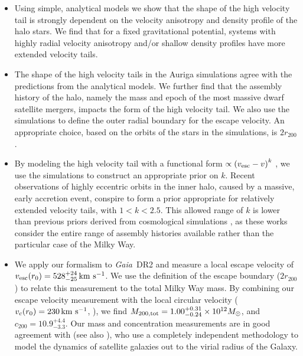 \documentclass[fleqn,usenatbib]{mnras}
\newcommand{\kms}        {\,{\rm km}\,\,{\rm s}^{-1}}
\newcommand{\gaia}		{\emph{Gaia}}
\begin{document}
\begin{itemize}

\item Using simple, analytical models we show that the shape of the high velocity tail is strongly dependent on the velocity anisotropy and density profile of the halo stars. We find that for a fixed gravitational potential, systems with highly radial velocity anisotropy and/or shallow density profiles have more extended velocity tails.

\item The shape of the high velocity tails in the Auriga simulations agree with the predictions from the analytical models. We further find that the assembly history of the halo, namely the mass and epoch of the most massive dwarf satellite mergers, impacts the form of the high velocity tail. We also use the simulations to define the outer radial boundary for the escape velocity. An appropriate choice, based on the orbits of the stars in the simulations, is $2r_{200}$.

\item By modeling the high velocity tail with a functional form $\propto \left(v_{\rm esc}-v\right)^k$ \citep{lt90}, we use the simulations to construct an appropriate prior on $k$. Recent observations of highly eccentric orbits in the inner halo, caused by a massive, early accretion event,  conspire to form a prior appropriate for relatively extended velocity tails, with $1 < k < 2.5$. This allowed range of $k$ is lower than previous priors derived from cosmological simulations \citep{smith07, piffl14}, as these works consider the entire range of assembly histories available rather than the particular case of the Milky Way.

\item We apply our formalism to \gaia\ DR2 and measure a local escape velocity of $v_{\rm esc}(r_0) = 528^{+24}_{-25} \kms$. We use the definition of the escape boundary ($2r_{200}$) to relate this measurement to the total Milky Way mass.  By combining our escape velocity measurement with the local circular velocity ($v_c(r_0) = 230 \kms$, \citealt{eilers18} ), we find $M_{200, \rm tot} = 1.00^{+0.31}_{-0.24} \times 10^{12}M_\odot$, and $c_{200} = 10.9^{+4.4}_{-3.3}$. Our mass and concentration measurements are in good agreement with \cite{callingham19} (see also \citealt{patel18}), who use a completely independent methodology to model the dynamics of satellite galaxies out to the virial radius of the Galaxy.

\end{itemize}
\end{document}
